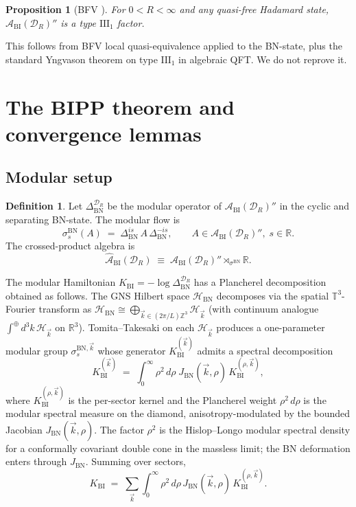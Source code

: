 \documentclass[11pt,a4paper]{article}
\newtheorem{proposition}[theorem]{Proposition}
\theoremstyle{definition}
\newtheorem{definition}[theorem]{Definition}
\newcommand{\R}{\mathbb{R}}
\newcommand{\Z}{\mathbb{Z}}
\newcommand{\T}{\mathbb{T}}
\newcommand{\cA}{\mathcal{A}}
\newcommand{\cH}{\mathcal{H}}
\newcommand{\cD}{\mathcal{D}}
\newcommand{\BI}{\mathrm{BI}}
\newcommand{\BN}{\mathrm{BN}}
\begin{document}
\begin{proposition}[BFV \cite{BFV03}]\label{prop:III1}
For $0<R<\infty$ and any quasi-free Hadamard state, $\cA_\BI(\cD_R)''$ is
a type $\mathrm{III}_1$ factor.
\end{proposition}

This follows from BFV local quasi-equivalence \cite{BFV03} applied to the
BN-state, plus the standard Yngvason theorem on type $\mathrm{III}_1$
in algebraic QFT. We do not reprove it.

\section{The BIPP theorem and convergence lemmas}\label{sec:BIPP}

\subsection{Modular setup}
\begin{definition}\label{def:BI-modular}
Let $\Delta_\BN^{\cD_R}$ be the modular operator of $\cA_\BI(\cD_R)''$ in
the cyclic and separating BN-state. The modular flow is
\begin{equation}
\sigma_s^\BN(A) \;=\; \Delta_\BN^{is}\,A\,\Delta_\BN^{-is}, \qquad
A\in\cA_\BI(\cD_R)'', \; s\in\R.
\end{equation}
The crossed-product algebra is
\begin{equation}
\widehat{\cA}_\BI(\cD_R) \;\equiv\; \cA_\BI(\cD_R)'' \rtimes_{\sigma^\BN} \R.
\end{equation}
\end{definition}

The modular Hamiltonian $K_\BI = -\log\Delta_\BN^{\cD_R}$ has a Plancherel
decomposition obtained as follows. The GNS Hilbert space $\cH_\BN$
decomposes via the spatial $\T^3$-Fourier transform as
$\cH_\BN \cong \bigoplus_{\vec k\in(2\pi/L)\Z^3}\cH_{\vec k}$ (with
continuum analogue $\int^\oplus d^3 k\,\cH_{\vec k}$ on $\R^3$).
Tomita--Takesaki on each $\cH_{\vec k}$ produces a one-parameter modular
group $\sigma_s^{\BN,\vec k}$ whose generator $K_\BI^{(\vec k)}$ admits a
spectral decomposition
\begin{equation}\label{eq:K-BI-sector}
K_\BI^{(\vec k)} \;=\; \int_0^\infty \rho^2\,d\rho\;
J_\BN(\vec k,\rho)\, K_\BI^{(\rho,\vec k)},
\end{equation}
where $K_\BI^{(\rho,\vec k)}$ is the per-sector kernel and the
Plancherel weight $\rho^2\,d\rho$ is the modular spectral measure on
the diamond, anisotropy-modulated by the bounded Jacobian
$J_\BN(\vec k,\rho)$. The factor $\rho^2$ is the Hislop--Longo
\cite{HislopLongo82} modular spectral density for a conformally
covariant double cone in the massless limit; the BN deformation enters
through $J_\BN$. Summing over sectors,
\begin{equation}\label{eq:K-BI}
K_\BI \;=\; \sum_{\vec k}\int_0^\infty \rho^2\,d\rho\,
J_\BN(\vec k,\rho)\,K_\BI^{(\rho,\vec k)}.
\end{equation}
\end{document}
